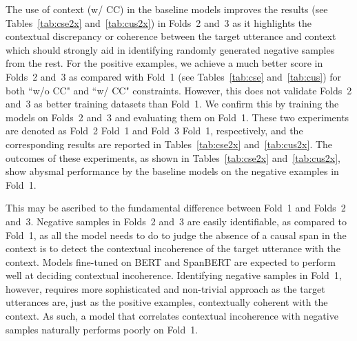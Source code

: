 \documentclass[smallextended]{svjour3}
\newcommand\0{\hphantom{0}}
\begin{document}
    




    


The use of context (w/ CC) in the baseline models improves the results (see Tables~\ref{tab:cse2x} and~\ref{tab:cus2x}) in Folds~2 and~3 as it highlights the contextual discrepancy or coherence between the target utterance and context which should strongly aid in identifying randomly generated negative samples from the rest. For the positive examples, we achieve a much better score in Folds~2 and~3 as compared with Fold~1 (see Tables~\ref{tab:cse} and~\ref{tab:cus}) for both ``w/o CC" and ``w/ CC" constraints. However, this does not validate Folds~2 and~3 as better training datasets than Fold~1. We confirm this by training the models on Folds~2 and~3 and evaluating them on Fold~1. These two experiments are denoted as {Fold~2  Fold~1} and {Fold~3  Fold~1}, respectively, and the corresponding results are reported in Tables~\ref{tab:cse2x} and~\ref{tab:cus2x}. The outcomes of these experiments, as shown in Tables~\ref{tab:cse2x} and~\ref{tab:cus2x}, show abysmal performance by the baseline models on the negative examples in Fold~1.

This may be ascribed to the fundamental difference between Fold~1 and Folds~2 and~3. Negative samples in Folds~2 and~3 are easily identifiable, as compared to Fold~1, as all the model needs to do to judge the absence of a causal span in the context is to detect the contextual incoherence of the target utterance with the context. Models fine-tuned on BERT and SpanBERT are expected to perform well at deciding contextual incoherence. Identifying negative samples in Fold~1, however, requires more sophisticated and non-trivial approach as the target utterances are, just as the positive examples, contextually coherent with the context. As such, a model that correlates contextual incoherence with negative samples naturally performs poorly on Fold~1.
\end{document}
